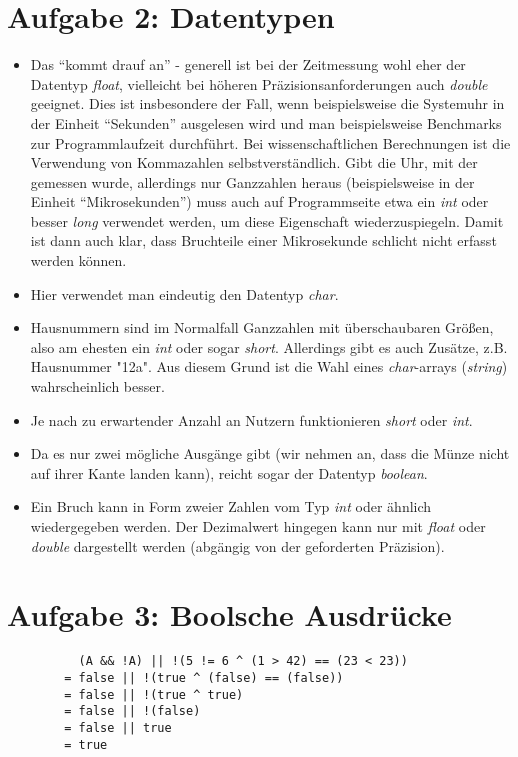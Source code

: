 \documentclass{article}
\begin{document}
    \section*{Aufgabe 2: Datentypen}
    \begin{itemize}
        \item Das "`kommt drauf an"' - generell ist bei der Zeitmessung wohl eher der Datentyp \textit{float}, vielleicht bei höheren Präzisionsanforderungen auch \textit{double} geeignet. Dies ist insbesondere der Fall, wenn beispielsweise die Systemuhr in der Einheit "`Sekunden"' ausgelesen wird und man beispielsweise Benchmarks zur Programmlaufzeit durchführt. Bei wissenschaftlichen Berechnungen ist die Verwendung von Kommazahlen selbstverständlich. Gibt die Uhr, mit der gemessen wurde, allerdings nur Ganzzahlen heraus (beispielsweise in der Einheit "`Mikrosekunden"') muss auch auf Programmseite etwa ein \textit{int} oder besser \textit{long} verwendet werden, um diese Eigenschaft wiederzuspiegeln. Damit ist dann auch klar, dass Bruchteile einer Mikrosekunde schlicht nicht erfasst werden können. 
        \item Hier verwendet man eindeutig den Datentyp \textit{char}.
        \item Hausnummern sind im Normalfall Ganzzahlen mit überschaubaren Größen, also am ehesten ein \textit{int} oder sogar \textit{short}. Allerdings gibt es auch Zusätze, z.B. Hausnummer "12a". Aus diesem Grund ist die Wahl eines \textit{char}-arrays (\textit{string}) wahrscheinlich besser.
        \item Je nach zu erwartender Anzahl an Nutzern funktionieren \textit{short} oder \textit{int}.
        \item Da es nur zwei mögliche Ausgänge gibt (wir nehmen an, dass die Münze nicht auf ihrer Kante landen kann), reicht sogar der Datentyp \textit{boolean}.
        \item Ein Bruch kann in Form zweier Zahlen vom Typ \textit{int} oder ähnlich wiedergegeben werden. Der Dezimalwert hingegen kann nur mit \textit{float} oder \textit{double} dargestellt werden (abgängig von der geforderten Präzision).
    \end{itemize}


    \section*{Aufgabe 3: Boolsche Ausdrücke}
    \begin{lstlisting}
          (A && !A) || !(5 != 6 ^ (1 > 42) == (23 < 23))
        = false || !(true ^ (false) == (false))
        = false || !(true ^ true)
        = false || !(false)
        = false || true
        = true
    \end{lstlisting}
\end{document}
